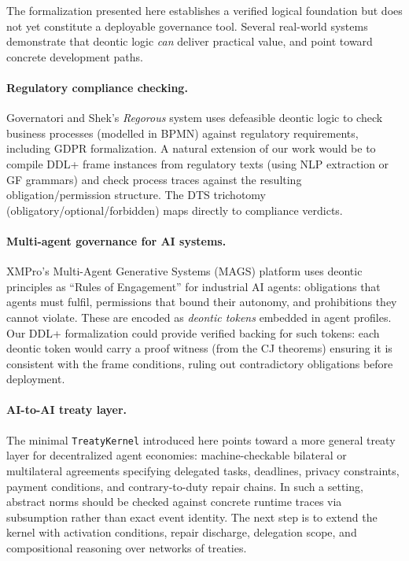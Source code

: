 \documentclass[]{article}
\newcommand{\code}[1]{\texttt{#1}}
\newcommand{\DDL}{\textup{DDL+}}
\newcommand{\DTS}{\textup{DTS}}
\begin{document}
The formalization presented here establishes a verified logical foundation
but does not yet constitute a deployable governance tool.  Several
real-world systems demonstrate that deontic logic \emph{can} deliver
practical value, and point toward concrete development paths.

\paragraph{Regulatory compliance checking.}
Governatori and Shek's \emph{Regorous} system \cite{Governatori2013}
uses defeasible deontic logic to check business processes (modelled in
BPMN) against regulatory requirements, including GDPR formalization.
A natural extension of our work would be to compile \DDL{} frame
instances from regulatory texts (using NLP extraction or GF grammars)
and check process traces against the resulting obligation/permission
structure.  The \DTS{} trichotomy (obligatory/optional/forbidden) maps
directly to compliance verdicts.

\paragraph{Multi-agent governance for AI systems.}
XMPro's Multi-Agent Generative Systems (MAGS) platform \cite{XMProMAGS}
uses deontic principles as ``Rules of Engagement'' for industrial AI agents:
obligations that agents must fulfil, permissions that bound their autonomy,
and prohibitions they cannot violate.  These are encoded as \emph{deontic tokens}
embedded in agent profiles.  Our \DDL{} formalization could provide verified
backing for such tokens: each deontic token would carry a proof witness
(from the CJ theorems) ensuring it is consistent with the frame conditions,
ruling out contradictory obligations before deployment.

\paragraph{AI-to-AI treaty layer.}
The minimal \code{TreatyKernel} introduced here points toward a more general
treaty layer for decentralized agent economies: machine-checkable bilateral or
multilateral agreements specifying delegated tasks, deadlines, privacy
constraints, payment conditions, and contrary-to-duty repair chains.  In such a
setting, abstract norms should be checked against concrete runtime traces via
subsumption rather than exact event identity.  The next step is to extend the
kernel with activation conditions, repair discharge, delegation scope, and
compositional reasoning over networks of treaties.
\end{document}

